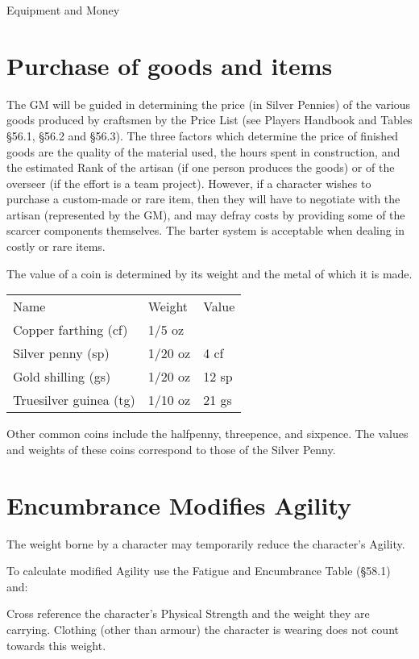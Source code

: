 \begin{Chapter}{Equipment and Money}

\section{Purchase of goods and items}

The GM will be guided in determining the price (in Silver Pennies) of
the various goods produced by craftsmen by the Price List (see Players
Handbook and Tables §56.1, §56.2 and §56.3).  The three factors which
determine the price of finished goods are the quality of the material
used, the hours spent in construction, and the estimated Rank of the
artisan (if one person produces the goods) or of the overseer (if the
effort is a team project).  However, if a character wishes to purchase
a custom-made or rare item, then they will have to negotiate with the
artisan (represented by the GM), and may defray costs by providing
some of the scarcer components themselves.  The barter system is
acceptable when dealing in costly or rare items.

The value of a coin is determined by its weight and the metal of which
it is made.

\begin{tabularx}{\columnwidth}{lll}
Name			& Weight	& Value \\
Copper farthing (cf)	& 1/5 oz	& \\
Silver penny (sp)	& 1/20 oz	& 4 cf \\
Gold shilling (gs)	& 1/20 oz	& 12 sp \\ 
Truesilver guinea (tg)	& 1/10 oz	& 21 gs \\
\end{tabularx}

Other common coins include the halfpenny, threepence, and sixpence.
The values and weights of these coins correspond to those of the
Silver Penny.

\section{Encumbrance Modifies Agility}

The weight borne by a character may temporarily reduce the character’s
Agility.

To calculate modified Agility use the Fatigue and Encumbrance Table
(§58.1) and:

\begin{Enumerate}

\item Cross reference the character’s Physical Strength and the weight
  they are carrying. Clothing (other than armour) the character is
  wearing does not count towards this weight.


\end{Enumerate}
\end{Chapter}
